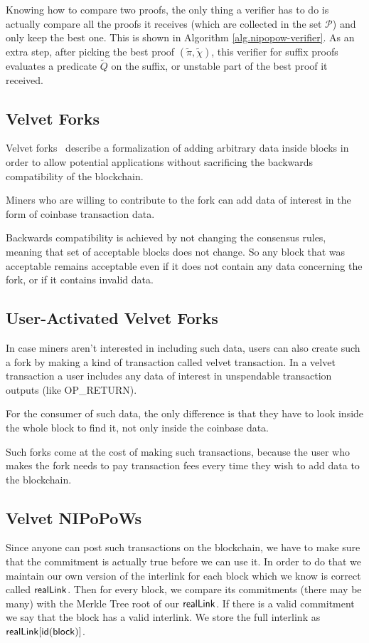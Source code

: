 

Knowing how to compare two proofs, the only thing a verifier has to do is actually compare all the proofs it receives (which are collected in the set $\mathcal{P}$) and only keep the best one. This is shown in Algorithm \ref{alg.nipopow-verifier}. As an extra step, after picking the best proof $(\tilde\pi, \tilde\chi)$, this verifier for suffix proofs evaluates a predicate $\tilde{Q}$ on the suffix, or unstable part of the best proof it received.


\subsection{Velvet Forks}
Velvet forks~\cite{nipopows,velvet} describe a formalization of adding arbitrary data inside blocks in order to allow potential applications without sacrificing the backwards compatibility of the blockchain.

Miners who are willing to contribute to the fork can add data of interest in the form of coinbase transaction data. 

Backwards compatibility is achieved by not changing the consensus rules, meaning that set of acceptable blocks does not change. So any block that was acceptable remains acceptable even if it does not contain any data concerning the fork, or if it contains invalid data.

\subsection{User-Activated Velvet Forks}
In case miners aren't interested in including such data, users can also create such a fork by making a kind of transaction called velvet transaction. In a velvet transaction a user includes any data of interest in unspendable transaction outputs (like OP\_RETURN).

For the consumer of such data, the only difference is that they have to look inside the whole block to find it, not only inside the coinbase data.

Such forks come at the cost of making such transactions, because the user who makes the fork needs to pay transaction fees every time they wish to add data to the blockchain.

\subsection{Velvet NIPoPoWs}
Since anyone can post such transactions on the blockchain, we have to make sure that the commitment is actually true before we can use it. In order to do that we maintain our own version of the interlink for each block which we know is correct called $\sf realLink$. Then for every block, we compare its commitments (there may be many) with the Merkle Tree root of our $\sf realLink$. If there is a valid commitment we say that the block has a valid interlink. We store the full interlink as $\sf realLink[id(block)]$.

